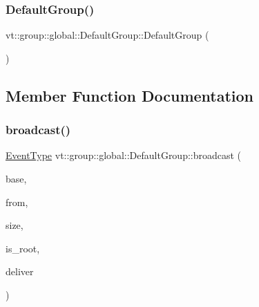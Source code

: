 \subsubsection{\texorpdfstring{Default\+Group()}{DefaultGroup()}}
{\footnotesize\ttfamily vt\+::group\+::global\+::\+Default\+Group\+::\+Default\+Group (\begin{DoxyParamCaption}{ }\end{DoxyParamCaption})\hspace{0.3cm}{\ttfamily [default]}}



\subsection{Member Function Documentation}
\mbox{\label{structvt_1_1group_1_1global_1_1_default_group_a7e175288780bf78baf4bdabf8d1292f0}} 
\subsubsection{\texorpdfstring{broadcast()}{broadcast()}}
{\footnotesize\ttfamily \hyperlink{namespacevt_a009267401def7ae8bf201892222d060f}{Event\+Type} vt\+::group\+::global\+::\+Default\+Group\+::broadcast (\begin{DoxyParamCaption}\item[{\hyperlink{namespacevt_ab2b3d506ec8e8d1540aede826d84a239}{Msg\+Shared\+Ptr}$<$ \hyperlink{namespacevt_a44d0d4e144748f2b19a1cfd962f50338}{Base\+Msg\+Type} $>$ const \&}]{base,  }\item[{\hyperlink{namespacevt_a866da9d0efc19c0a1ce79e9e492f47e2}{Node\+Type} const \&}]{from,  }\item[{\hyperlink{namespacevt_a408e86a8c7c89309b52907dc5a513924}{Msg\+Size\+Type} const \&}]{size,  }\item[{bool const}]{is\+\_\+root,  }\item[{bool $\ast$const}]{deliver }\end{DoxyParamCaption})\hspace{0.3cm}{\ttfamily [static]}}

\mbox{\label{structvt_1_1group_1_1global_1_1_default_group_a2f503c7d6615e558ce08b0de7a1e8bfa}} 
